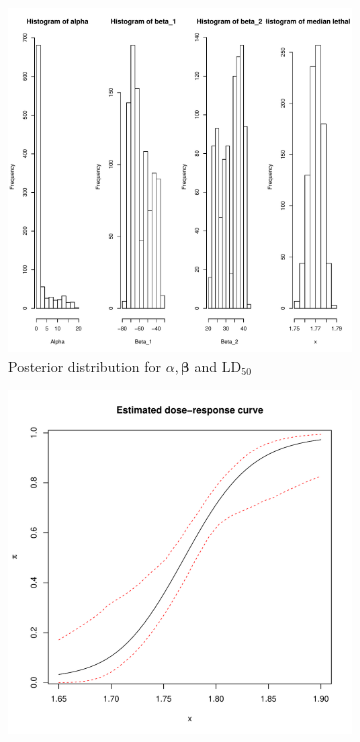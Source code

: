 \documentclass[]{article}
\begin{document}
\begin{enumerate}
{\begin{itemize}
\begin{figure}[ht!]
\begin{subfigure}{0.45\linewidth}
        			\includegraphics[width = \textwidth]{pic/HW3_2/c1.pdf}
        			\caption{Posterior distribution for $\alpha,\bm{\beta}$ and $\mathrm{LD}_{50}$}
        		\end{subfigure}
        		\begin{subfigure}{0.45\linewidth}
        			\includegraphics[width = \textwidth]{pic/HW3_2/c2.pdf}

\end{subfigure}
\end{figure}
\end{itemize}}
\end{enumerate}
\end{document}
